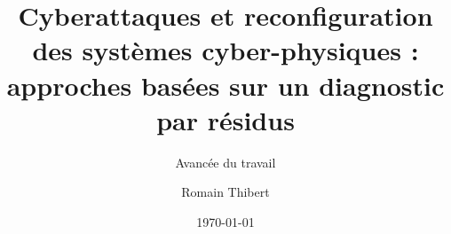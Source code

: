 \documentclass[aspectratio=169]{beamer}
\title{Cyberattaques et reconfiguration des systèmes cyber-physiques : approches basées sur un diagnostic par résidus}
\subtitle{Avancée du travail}
\author[R. Thibert]{Romain Thibert}
\date[2022]{\today}
\begin{document}
\frame{\titlepage}
\end{document}
